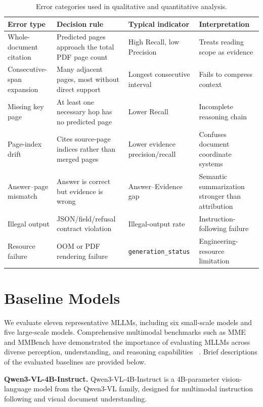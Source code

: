 \documentclass{article} %
\begin{document}
\begin{table}[!htb]
\centering
\caption{Error categories used in qualitative and quantitative analysis.}
\label{tab:app_error_taxonomy}
\scriptsize
\begin{tabularx}{\linewidth}{l X X X}
\toprule
\textbf{Error type} & \textbf{Decision rule} & \textbf{Typical indicator} & \textbf{Interpretation} \\
\midrule
Whole-document citation & Predicted pages approach the total PDF page count & High Recall, low Precision & Treats reading scope as evidence \\
Consecutive-span expansion & Many adjacent pages, most without direct support & Longest consecutive interval & Fails to compress context \\
Missing key page & At least one necessary hop has no predicted page & Lower Recall & Incomplete reasoning chain \\
Page-index drift & Cites source-page indices rather than merged  pages & Lower evidence precision/recall & Confuses document coordinate systems \\
Answer--page mismatch & Answer is correct but evidence is wrong & Answer--Evidence gap & Semantic summarization stronger than attribution \\
Illegal output & JSON/field/refusal contract violation & Illegal-output rate & Instruction-following failure \\
Resource failure & OOM or PDF rendering failure & \texttt{generation\_\allowbreak status} & Engineering-resource limitation \\
\bottomrule
\end{tabularx}
\end{table}


\FloatBarrier
\endgroup


\section{Baseline Models}
\label{app:baselines}

We evaluate eleven representative MLLMs, including six small-scale models and five large-scale models. Comprehensive multimodal benchmarks such as MME and
MMBench have demonstrated the importance of evaluating MLLMs across diverse
perception, understanding, and reasoning capabilities
~\cite{fu2023mme,liu2024mmbench}.
Brief descriptions of the evaluated baselines
are provided below.  

\noindent\textbf{Qwen3-VL-4B-Instruct.}
Qwen3-VL-4B-Instruct is a 4B-parameter vision-language model from the Qwen3-VL family, designed for multimodal instruction following and visual document understanding.
\end{document}
